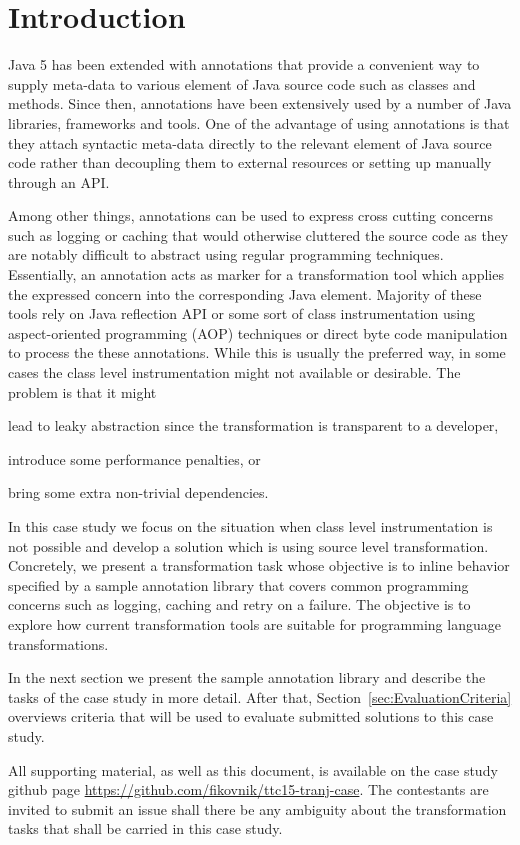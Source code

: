
\section{Introduction}
\label{sec:Introduction}

Java 5 has been extended with annotations that provide a convenient way to supply meta-data to various element of Java source code such as classes and methods.
Since then, annotations have been extensively used by a number of Java libraries, frameworks and tools.
One of the advantage of using annotations is that they attach syntactic meta-data directly to the relevant element of Java source code rather than decoupling them to external resources or setting up manually through an API.

Among other things, annotations can be used to express cross cutting concerns such as logging or caching that would otherwise cluttered the source code as they are notably difficult to abstract using regular programming techniques.
Essentially, an annotation acts as marker for a transformation tool which applies the expressed concern into the corresponding Java element.
Majority of these tools rely on Java reflection API or some sort of class instrumentation using aspect-oriented programming (AOP) techniques or direct byte code manipulation to process the these annotations.
While this is usually the preferred way, in some cases the class level instrumentation might not available or desirable.
The problem is that it might 
%
\begin{inparaenum}[(i)]
\item lead to leaky abstraction since the transformation is transparent to a developer,
\item introduce some performance penalties, or
\item bring some extra non-trivial dependencies.
\end{inparaenum}

In this case study we focus on the situation when class level instrumentation is not possible and develop a solution which is using source level transformation.
Concretely, we present a transformation task whose objective is to inline behavior specified by a sample annotation library that covers common programming concerns such as logging, caching and retry on a failure.
The objective is to explore how current transformation tools are suitable for programming language transformations.

In the next section we present the sample annotation library and describe the tasks of the case study in more detail.
After that, Section~\ref{sec:EvaluationCriteria} overviews criteria that will be used to evaluate submitted solutions to this case study.

All supporting material, as well as this document, is available on the case study github page \url{https://github.com/fikovnik/ttc15-tranj-case}.
The contestants are invited to submit an issue shall there be any ambiguity about the transformation tasks that shall be carried in this case study.

